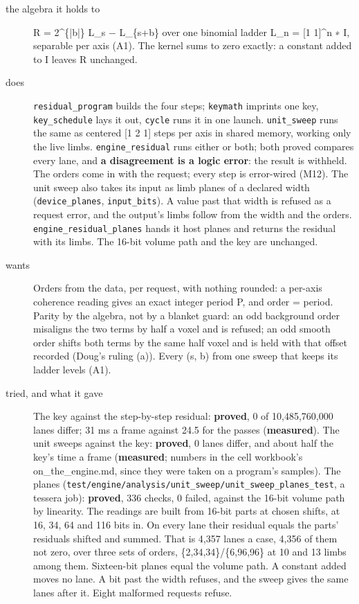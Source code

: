 \begin{description}
\item[{the algebra it holds to}] R = 2\textasciicircum{}\{|b|\} L\_\allowbreak{}s − L\_\allowbreak{}\{s+b\} over one binomial ladder L\_\allowbreak{}n = [1 1]\textasciicircum{}n ∗ I, separable per axis (A1). The kernel sums to zero exactly: a constant added to I leaves R unchanged.
\item[{does}] \texttt{residual\_\allowbreak{}program} builds the four steps; \texttt{keymath} imprints one key, \texttt{key\_\allowbreak{}schedule} lays it out, \texttt{cycle} runs it in one launch. \texttt{unit\_\allowbreak{}sweep} runs the same as centered [1 2 1] steps per axis in shared memory, working only the live limbs. \texttt{engine\_\allowbreak{}residual} runs either or both; both proved compares every lane, and \textbf{a disagreement is a logic error}: the result is withheld. The orders come in with the request; every step is error-wired (M12). The unit sweep also takes its input as limb planes of a declared width (\texttt{device\_\allowbreak{}planes}, \texttt{input\_\allowbreak{}bits}). A value past that width is refused as a request error, and the output's limbs follow from the width and the orders. \texttt{engine\_\allowbreak{}residual\_\allowbreak{}planes} hands it host planes and returns the residual with its limbs. The 16-bit volume path and the key are unchanged.
\item[{wants}] Orders from the data, per request, with nothing rounded: a per-axis coherence reading gives an exact integer period P, and order = period. Parity by the algebra, not by a blanket guard: an odd background order misaligns the two terms by half a voxel and is refused; an odd smooth order shifts both terms by the same half voxel and is held with that offset recorded (Doug's ruling (a)). Every (s, b) from one sweep that keeps its ladder levels (A1).
\item[{tried, and what it gave}] The key against the step-by-step residual: \textbf{proved}, 0 of 10,485,760,000 lanes differ; 31 ms a frame against 24.5 for the passes (\textbf{measured}). The unit sweeps against the key: \textbf{proved}, 0 lanes differ, and about half the key's time a frame (\textbf{measured}; numbers in the cell workbook's on\_\allowbreak{}the\_\allowbreak{}engine.md, since they were taken on a program's samples). The planes (\texttt{test/\allowbreak{}engine/\allowbreak{}analysis/\allowbreak{}unit\_\allowbreak{}sweep/\allowbreak{}unit\_\allowbreak{}sweep\_\allowbreak{}planes\_\allowbreak{}test}, a tessera job): \textbf{proved}, 336 checks, 0 failed, against the 16-bit volume path by linearity. The readings are built from 16-bit parts at chosen shifts, at 16, 34, 64 and 116 bits in. On every lane their residual equals the parts' residuals shifted and summed. That is 4,357 lanes a case, 4,356 of them not zero, over three sets of orders, \{2,34,34\}/\{6,96,96\} at 10 and 13 limbs among them. Sixteen-bit planes equal the volume path. A constant added moves no lane. A bit past the width refuses, and the sweep gives the same lanes after it. Eight malformed requests refuse.

\end{description}
